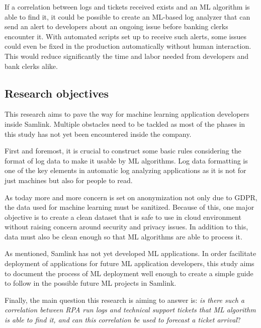 If a correlation between logs and tickets received exists
and an ML algorithm is able to find it,
it could be possible to create an ML-based log analyzer
that can send an alert to developers
about an ongoing issue before banking clerks encounter it.
With automated scripts set up to receive such alerts,
some issues could even be fixed in the production
automatically without human interaction.
This would reduce significantly the time and labor needed
from developers and bank clerks alike.


\subsection{Research objectives}\label{subsec:intro-research-objectives}
This research aims to
pave the way for machine learning application developers
inside Samlink.
Multiple obstacles need to be tackled
as most of the phases in this study
has not yet been encountered inside the company.

First and foremost,
it is crucial to construct some basic rules
considering the format of log data
to make it usable by ML algorithms.
Log data formatting
is one of the key elements in automatic log analyzing applications
as it is not for just machines
but also for people to read.

As today more and more concern is set on anonymization
not only due to GDPR,
the data used for machine learning must be sanitized.
Because of this,
one major objective is to create a clean dataset
that is safe to use in cloud environment
without raising concern around security and privacy issues.
In addition to this,
data must also be clean enough
so that ML algorithms
are able to process it.

As mentioned,
Samlink has not yet developed ML applications.
In order facilitate deployment of applications
for future ML application developers,
this study aims to document the process of ML deployment
well enough to create a simple guide to follow
in the possible future ML projects in Samlink.

Finally,
the main question this research is aiming to answer is:
\textit{is there such a correlation between RPA run logs and technical support tickets
that ML algorithm is able to find it,
and can this correlation be used to forecast a ticket arrival}?



